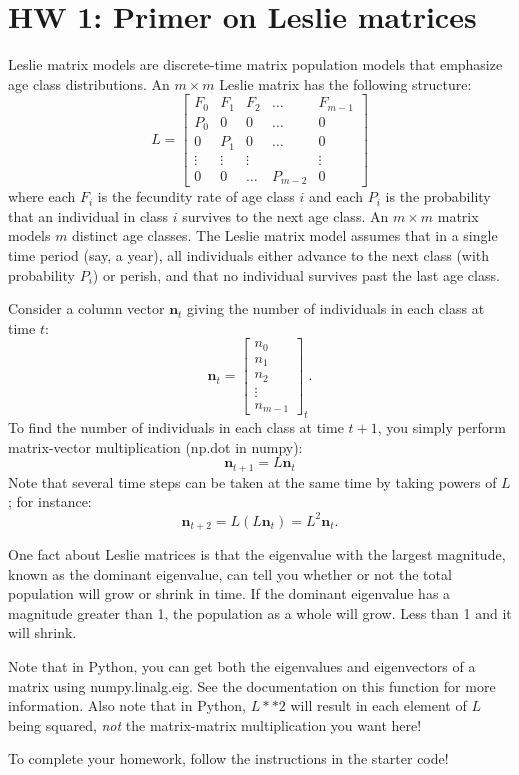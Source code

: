 \documentclass[11pt]{article}
\begin{document}
\section*{HW 1: Primer on Leslie matrices}

Leslie matrix models are discrete-time matrix population models that emphasize age class distributions. An $m\times m$ Leslie matrix has the following structure:
\[L =
\left[\begin{array}{ccccc}
F_0 & F_1 & F_2 & \ldots & F_{m-1} \\ 
P_0 & 0 & 0 &\ldots  & 0 \\ 
0 & P_1 & 0 & \ldots & 0 \\ 
\vdots & \vdots & \vdots & \  & \vdots \\ 
0 & 0 & \ldots & P_{m-2} & 0
\end{array}\right]
\]
where each $F_i$ is the fecundity rate of age class $i$ and each $P_i$ is the probability that an individual in class $i$ survives to the next age class. An $m\times m$ matrix models $m$ distinct age classes. The Leslie matrix model assumes that in a single time period (say, a year), all individuals either advance to the next class (with probability $P_i$) or perish, and that no individual survives past the last age class.

Consider a column vector $\mathbf{n}_t$ giving the number of individuals in each class at time $t$:
\[
\mathbf{n}_t = \left[\begin{array}{c}
n_0\\ 
n_1\\ 
n_2\\ 
\vdots\\ 
n_{m-1}
\end{array} \right]_t.
\]
To find the number of individuals in each class at time $t+1$, you simply perform matrix-vector multiplication (np.dot in numpy):
\[
\mathbf{n}_{t+1} = L\mathbf{n}_t
\]
Note that several time steps can be taken at the same time by taking powers of $L$; for instance:
\[
\mathbf{n}_{t+2} = L(L\mathbf{n}_t) = L^2\mathbf{n}_t.
\]

One fact about Leslie matrices is that the eigenvalue with the largest magnitude, known as the dominant eigenvalue, can tell you whether or not the total population will grow or shrink in time. If the dominant eigenvalue has a magnitude greater than 1, the population as a whole will grow. Less than 1 and it will shrink.

Note that in Python, you can get both the eigenvalues and eigenvectors of a matrix using numpy.linalg.eig. See the documentation on this function for more information. Also note that in Python, $L**2$ will result in each element of $L$ being squared, \textit{not} the matrix-matrix multiplication you want here!

To complete your homework, follow the instructions in the starter code!
\end{document}

